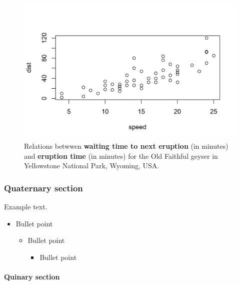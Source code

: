 \documentclass[
12pt,
openright,
oneside,
a4paper,
chapter=TITLE,
section=TITLE,
french,
spanish,
brazil,
english
]{abntex2}
\let\oldparagraph\paragraph
\renewcommand{\paragraph}[1]{\oldparagraph{#1}\mbox{}}
\let\oldsubparagraph\subparagraph
\renewcommand{\subparagraph}[1]{\oldsubparagraph{#1}\mbox{}}
\providecommand{\tightlist}{
\setlength{\itemsep}{0pt}\setlength{\parskip}{0pt}}%
\begin{document}
\begin{figure}[H]

\caption{Relations betwwen \textbf{waiting time to next eruption} (in
minutes) and \textbf{eruption time} (in minutes) for the Old Faithful
geyser in Yellowstone National Park, Wyoming, USA.}

{\centering \includegraphics{index_files/figure-pdf/unnamed-chunk-4-1.png}

}

\end{figure}

\hypertarget{quaternary-section}{%
\subsubsection{Quaternary section}\label{quaternary-section}}

Example text.

\begin{itemize}
\tightlist
\item
  Bullet point

  \begin{itemize}
  \tightlist
  \item
    Bullet point

    \begin{itemize}
    \tightlist
    \item
      Bullet point
    \end{itemize}
  \end{itemize}
\end{itemize}

\hypertarget{quinary-section}{%
\paragraph{Quinary section}\label{quinary-section}}
\end{document}
